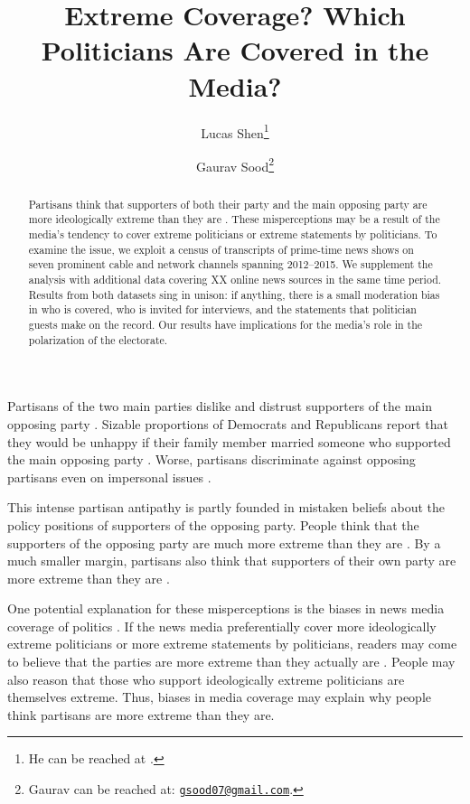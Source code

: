 \documentclass[12pt, letterpaper]{article}
\title{Extreme Coverage? Which Politicians Are Covered in the Media?\\\vspace{10mm}}
\author{Lucas Shen\thanks{He can be reached at \href{mailto:}{\texttt{}}.} \and Gaurav Sood\thanks{Gaurav can be reached at: \href{mailto:gsood07@gmail.com}{\texttt{gsood07@gmail.com}}.}}
\begin{document}
\maketitle

\begin{comment}

setwd(paste0(githubdir, "who/ms"))
tools::texi2dvi("polarnews.tex", pdf = TRUE, clean = TRUE)
setwd(basedir)

\end{comment}

\begin{abstract}
Partisans think that supporters of both their party and the main opposing party are more ideologically extreme than they are \citep{Ahler2014, levendusky2015}.  These misperceptions may be a result of the media's tendency to cover extreme politicians or extreme statements by politicians. To examine the issue, we exploit a census of transcripts of prime-time news shows on seven prominent cable and network channels spanning 2012--2015. We supplement the analysis with additional data covering XX online news sources in the same time period. Results from both datasets sing in unison: if anything, there is a small moderation bias in who is covered, who is invited for interviews, and the statements that politician guests make on the record. Our results have implications for the media's role in the polarization of the electorate.
\end{abstract}

\clearpage
\doublespace

Partisans of the two main parties dislike and distrust supporters of the main opposing party \citep{iyengar2012,iyengar2015fear}. Sizable proportions of Democrats and Republicans report that they would be unhappy if their family member married someone who supported the main opposing party \citep{iyengar2012}.  Worse, partisans discriminate against opposing partisans even on impersonal issues \citep{iyengar2015fear}.

This intense partisan antipathy is partly founded in mistaken beliefs about the policy positions of supporters of the opposing party. People think that the supporters of the opposing party are much more extreme than they are \citep{Ahler2014, levendusky2015}. By a much smaller margin, partisans also think that supporters of their own party are more extreme than they are \citep{Ahler2014, levendusky2015}.

One potential explanation for these misperceptions is the biases in news media coverage of politics \citep{levendusky2015}. If the news media preferentially cover more ideologically extreme politicians or more extreme statements by politicians, readers may come to believe that the parties are more extreme than they actually are \citep{tversky1973availability, iyengar1990}.  People may also reason that those who support ideologically extreme politicians are themselves extreme. Thus, biases in media coverage may explain why people think partisans are more extreme than they are.
\end{document}
